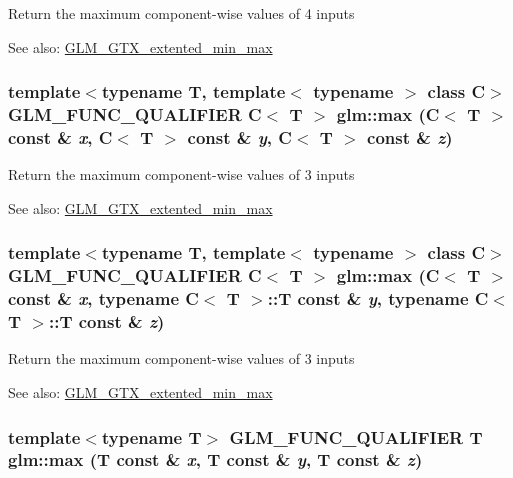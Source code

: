 Return the maximum component-wise values of 4 inputs \begin{Desc}
\item[See also:]\hyperlink{group__gtx__extented__min__max}{GLM\_\-GTX\_\-extented\_\-min\_\-max} \end{Desc}
\hypertarget{group__gtx__extented__min__max_g88f52afea5c8c6d5f3197816cc3f9607}{
\subsubsection[max]{\setlength{\rightskip}{0pt plus 5cm}template$<$typename T, template$<$ typename $>$ class C$>$ GLM\_\-FUNC\_\-QUALIFIER C$<$ T $>$ glm::max (C$<$ T $>$ const \& {\em x}, \/  C$<$ T $>$ const \& {\em y}, \/  C$<$ T $>$ const \& {\em z})}}
\label{group__gtx__extented__min__max_g88f52afea5c8c6d5f3197816cc3f9607}


Return the maximum component-wise values of 3 inputs \begin{Desc}
\item[See also:]\hyperlink{group__gtx__extented__min__max}{GLM\_\-GTX\_\-extented\_\-min\_\-max} \end{Desc}
\hypertarget{group__gtx__extented__min__max_g55d5788e40f5915e95108d2c611fc42e}{
\subsubsection[max]{\setlength{\rightskip}{0pt plus 5cm}template$<$typename T, template$<$ typename $>$ class C$>$ GLM\_\-FUNC\_\-QUALIFIER C$<$ T $>$ glm::max (C$<$ T $>$ const \& {\em x}, \/  typename C$<$ T $>$::T const \& {\em y}, \/  typename C$<$ T $>$::T const \& {\em z})}}
\label{group__gtx__extented__min__max_g55d5788e40f5915e95108d2c611fc42e}


Return the maximum component-wise values of 3 inputs \begin{Desc}
\item[See also:]\hyperlink{group__gtx__extented__min__max}{GLM\_\-GTX\_\-extented\_\-min\_\-max} \end{Desc}
\hypertarget{group__gtx__extented__min__max_g15a13c57e770e4e4058140ce507632c0}{
\subsubsection[max]{\setlength{\rightskip}{0pt plus 5cm}template$<$typename T$>$ GLM\_\-FUNC\_\-QUALIFIER T glm::max (T const \& {\em x}, \/  T const \& {\em y}, \/  T const \& {\em z})}}
\label{group__gtx__extented__min__max_g15a13c57e770e4e4058140ce507632c0}


